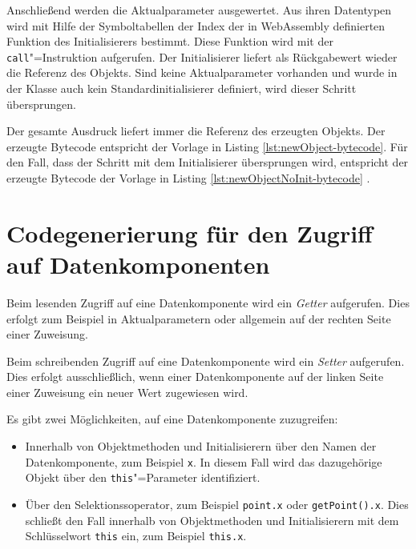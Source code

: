 Anschließend werden die Aktualparameter ausgewertet. Aus ihren Datentypen wird mit Hilfe der Symboltabellen der Index der in WebAssembly definierten Funktion des Initialisierers bestimmt. Diese Funktion wird mit der \lstinline{call}"=Instruktion aufgerufen. Der Initialisierer liefert als Rückgabewert wieder die Referenz des Objekts. Sind keine Aktualparameter vorhanden und wurde in der Klasse auch kein Standardinitialisierer definiert, wird dieser Schritt übersprungen.

Der gesamte Ausdruck liefert immer die Referenz des erzeugten Objekts. Der erzeugte Bytecode entspricht der Vorlage in Listing \ref{lst:newObject-bytecode}. Für den Fall, dass der Schritt mit dem Initialisierer übersprungen wird, entspricht der erzeugte Bytecode der Vorlage in Listing \ref{lst:newObjectNoInit-bytecode} .





\section{Codegenerierung für den Zugriff auf Datenkomponenten}
\label{sec:Codegenerierung-für-den-Zugriff-auf-Datenkomponenten}

Beim lesenden Zugriff auf eine Datenkomponente wird ein \emph{Getter} aufgerufen. Dies erfolgt zum Beispiel in Aktualparametern oder allgemein auf der rechten Seite einer Zuweisung.

Beim schreibenden Zugriff auf eine Datenkomponente wird ein \emph{Setter} aufgerufen. Dies erfolgt ausschließlich, wenn einer Datenkomponente auf der linken Seite einer Zuweisung ein neuer Wert zugewiesen wird.

Es gibt zwei Möglichkeiten, auf eine Datenkomponente zuzugreifen:
\begin{itemize}
    \item Innerhalb von Objektmethoden und Initialisierern über den Namen der Datenkomponente, zum Beispiel \lstinline{x}. In diesem Fall wird das dazugehörige Objekt über den \lstinline{this}"=Parameter identifiziert.
    \item Über den Selektionssoperator, zum Beispiel \lstinline{point.x} oder \lstinline{getPoint().x}. Dies schließt den Fall innerhalb von Objektmethoden und Initialisierern mit dem Schlüsselwort \lstinline{this} ein, zum Beispiel \lstinline{this.x}.
\end{itemize}


